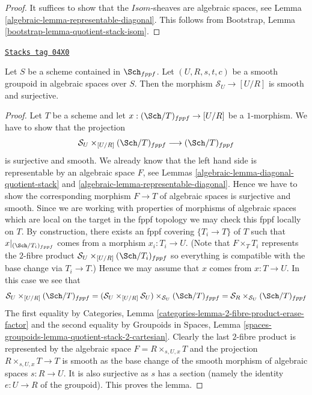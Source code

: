 \begin{proof}

It suffices to show that the $\mathit{Isom}$-sheaves are algebraic
spaces, see
Lemma \ref{algebraic-lemma-representable-diagonal}.
This follows from
Bootstrap, Lemma \ref{bootstrap-lemma-quotient-stack-isom}.
\end{proof}

\begin{lemma}
\label{algebraic-lemma-smooth-quotient-smooth-presentation}
\href{https://stacks.math.columbia.edu/tag/04X0}{\texttt{Stacks tag 04X0}}

Let $S$ be a scheme contained in $\Sch_{fppf}$.
Let $(U, R, s, t, c)$ be a smooth groupoid in algebraic spaces over $S$.
Then the morphism $\mathcal{S}_U \to [U/R]$ is smooth and surjective.
\end{lemma}

\begin{proof}

Let $T$ be a scheme and let $x : (\Sch/T)_{fppf} \to [U/R]$
be a $1$-morphism. We have to show that the projection
$$
\mathcal{S}_U \times_{[U/R]} (\Sch/T)_{fppf}
\longrightarrow
(\Sch/T)_{fppf}
$$
is surjective and smooth. We already know that the left hand side
is representable by an algebraic space $F$, see
Lemmas \ref{algebraic-lemma-diagonal-quotient-stack} and
\ref{algebraic-lemma-representable-diagonal}.
Hence we have to show the corresponding morphism $F \to T$ of
algebraic spaces is surjective and smooth.
Since we are working with properties of morphisms of algebraic
spaces which are local on the target in the fppf topology we
may check this fppf locally on $T$. By construction, there exists
an fppf covering $\{T_i \to T\}$ of $T$ such that
$x|_{(\Sch/T_i)_{fppf}}$ comes from a morphism
$x_i : T_i \to U$. (Note that $F \times_T T_i$ represents the
$2$-fibre product $\mathcal{S}_U \times_{[U/R]} (\Sch/T_i)_{fppf}$
so everything is compatible with the base change via $T_i \to T$.)
Hence we may assume that $x$ comes from $x : T \to U$.
In this case we see that
$$
\mathcal{S}_U \times_{[U/R]} (\Sch/T)_{fppf}
=
(\mathcal{S}_U \times_{[U/R]} \mathcal{S}_U)
\times_{\mathcal{S}_U} (\Sch/T)_{fppf}
=
\mathcal{S}_R \times_{\mathcal{S}_U} (\Sch/T)_{fppf}
$$
The first equality by
Categories, Lemma \ref{categories-lemma-2-fibre-product-erase-factor}
and the second equality by
Groupoids in Spaces,
Lemma \ref{spaces-groupoids-lemma-quotient-stack-2-cartesian}.
Clearly the last $2$-fibre product is represented by the algebraic
space $F = R \times_{s, U, x} T$ and the projection
$R \times_{s, U, x} T \to T$ is smooth as the base change of
the smooth morphism of algebraic spaces $s : R \to U$.
It is also surjective as $s$ has a section (namely the identity
$e : U \to R$ of the groupoid).
This proves the lemma.
\end{proof}

